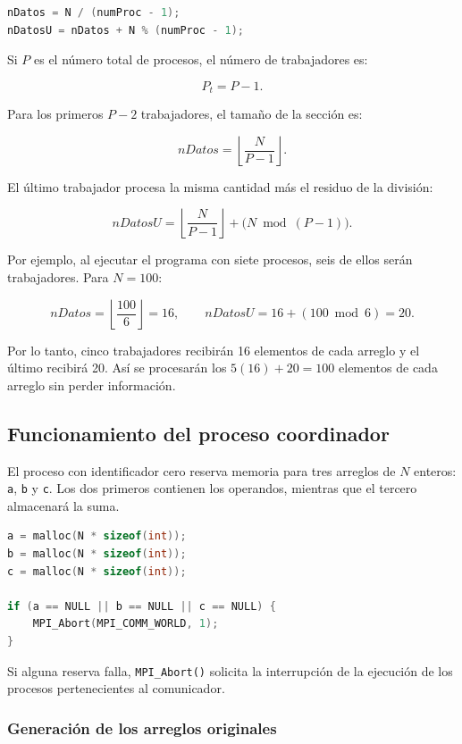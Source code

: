 \documentclass[12pt,a4paper]{article}
\begin{document}
\begin{lstlisting}[language=C]
nDatos = N / (numProc - 1);
nDatosU = nDatos + N % (numProc - 1);
\end{lstlisting}

Si \(P\) es el número total de procesos, el número de trabajadores es:

\[
P_t=P-1.
\]

Para los primeros \(P-2\) trabajadores, el tamaño de la sección es:

\[
nDatos=\left\lfloor\frac{N}{P-1}\right\rfloor.
\]

El último trabajador procesa la misma cantidad más el residuo de la división:

\[
nDatosU=\left\lfloor\frac{N}{P-1}\right\rfloor
+\bigl(N\bmod(P-1)\bigr).
\]

Por ejemplo, al ejecutar el programa con siete procesos, seis de ellos serán
trabajadores. Para \(N=100\):

\[
nDatos=\left\lfloor\frac{100}{6}\right\rfloor=16,
\qquad
nDatosU=16+(100\bmod 6)=20.
\]

Por lo tanto, cinco trabajadores recibirán 16 elementos de cada arreglo y el
último recibirá 20. Así se procesarán los \(5(16)+20=100\) elementos de cada
arreglo sin perder información.

\subsection{Funcionamiento del proceso coordinador}

El proceso con identificador cero reserva memoria para tres arreglos de
\(N\) enteros: \texttt{a}, \texttt{b} y \texttt{c}. Los dos primeros contienen
los operandos, mientras que el tercero almacenará la suma.

\begin{lstlisting}[language=C]
a = malloc(N * sizeof(int));
b = malloc(N * sizeof(int));
c = malloc(N * sizeof(int));

if (a == NULL || b == NULL || c == NULL) {
    MPI_Abort(MPI_COMM_WORLD, 1);
}
\end{lstlisting}

Si alguna reserva falla, \texttt{MPI\_Abort()} solicita la interrupción de la
ejecución de los procesos pertenecientes al comunicador.

\subsubsection{Generación de los arreglos originales}
\end{document}
